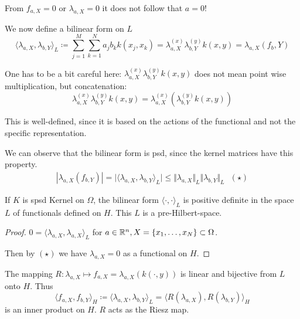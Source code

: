 \begin{remark}
    From $f_{a,X}=0$ or $\lambda_{a,X}=0$ it does not follow that $a=0$!
\end{remark}

We now define a bilinear form on $L$
\[\langle \lambda_{a,X},\lambda_{b,Y}\rangle_L\coloneqq \sum_{j=1}^M\sum_{k=1}^N a_j b_k k(x_j,x_k)=\lambda_{a,X}^{(x)}\lambda_{b,Y}^{(y)} k(x,y)=\lambda_{a,X}(f_b,Y)\]

\begin{aremark}
    One has to be a bit careful here: $\lambda_{a,X}^{(x)}\lambda_{b,Y}^{(y)} k(x,y)$ does not mean point wise multiplication, but concatenation:
    \[\lambda_{a,X}^{(x)}\lambda_{b,Y}^{(y)} k(x,y)=\lambda_{a,X}^{(x)}(\lambda_{b,Y}^{(y)} k(x,y))\]
\end{aremark}

This is well-defined, 
since it is based on the actions of the functional 
and not the specific representation.

We can observe that  the bilinear form is psd, since the kernel matrices have this property.
\begin{align*}
    \left\vert \lambda_{a,X}(f_{b,Y}) \right\vert=\vert \langle \lambda_{a,X},\lambda_{b,Y}\rangle_L\vert\leq \Vert \lambda_{a,X}\Vert_L \Vert \lambda_{b,Y}\Vert_L \text{ }(\star)
\end{align*}

\begin{theorem}\label{thm:1.7}
    If $K$ is spsd Kernel on $\Omega$, 
    the bilinear form $\langle\cdot,\cdot\rangle_L$ 
    is positive definite in the space $L$ of functionals 
    defined on $H$. This $L$ is a pre-Hilbert-space.

\end{theorem}

\begin{proof}
$0=\langle \lambda_{a,X},\lambda_{a,X}\rangle_L$ for $a\in\mathbb{R}^n,X=\{x_1,\dots,x_N\}\subset \Omega$.

Then by $(\star)$ we have $\lambda_{a,X}=0$ as a functional on $H$. 
\end{proof}

\begin{theorem}\label{thm:1.8}
    The mapping $R:\lambda_{a,X}\mapsto f_{a,X}=\lambda_{a,X}(k(\cdot,y))$ is linear and bijective from $L$ onto $H$. Thus 
    \[\langle f_{a,X},f_{b,Y}\rangle_H\coloneqq \langle \lambda_{a,X},\lambda_{b,Y}\rangle_L=\langle R(\lambda_{a,X}),R(\lambda_{b,Y})\rangle_H\]
    is an inner product on $H$. $R$ acts as the Riesz map. 
\end{theorem}

